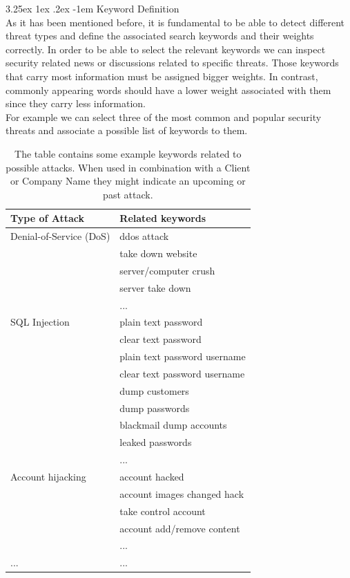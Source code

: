 \documentclass[12pt]{article}
\makeatletter
\renewcommand\paragraph{\@startsection{paragraph}{5}{\z@}%
  {3.25ex \@plus1ex \@minus.2ex}%
  {-1em}%
  {\normalfont\normalsize\bfseries}}
\makeatother
\begin{document}
\paragraph{Keyword Definition}
\hfill \break \\
As it has been mentioned before, it is fundamental to be able to detect different threat types and define the associated search keywords and their weights correctly. In order to be able to select the relevant keywords we can inspect security related news \cite{list-2015-attacks} or discussions related to specific threats. Those keywords that carry most information must be assigned bigger weights. In contrast, commonly appearing words should have a lower weight associated with them since they carry less information.  
\hfill \break \\
For example we can select three of the most common and popular security threats\cite{owasp} and associate a possible list of keywords to them. 
\begin {table}[h!]
\label{tab:title} 
\begin{center} 
\begin{longtable}{|l | l|}
\hline
Type of Attack & Related keywords \\ 
\hline
 Denial-of-Service (DoS) & ddos attack \\ 
 						& take down website \\ 
 						&  server/computer crush  \\
 						& server take down \\
 						& ... \\

\hline
SQL Injection 	& plain text password\\
				& clear text password \\
				& plain text password username \\
				& clear text password username\\
				& dump customers \\
				& dump passwords \\
				& blackmail dump accounts \\
				& leaked passwords \\
				& ... \\
				
\hline
Account hijacking & account hacked \\
				  & account images changed hack \\
				  & take control account \\
				  & account add/remove content \\ 
				  & ... \\	
\hline
... & ...\\		  
\hline
\end{longtable}
\caption {The table contains some example keywords related to possible attacks. When used in combination with a Client or Company Name they might indicate an upcoming or past attack.}
\end{center} 
\end {table}
\newpage
\end{document}

